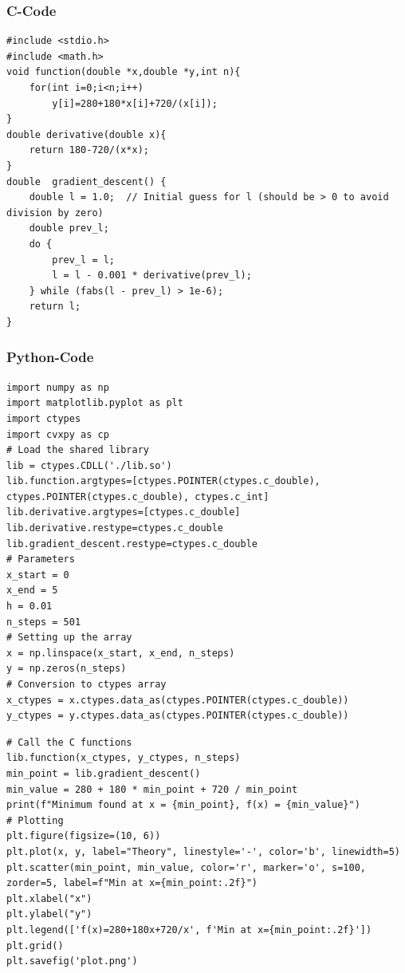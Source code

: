 \documentclass{beamer}
\begin{document}
\begin{frame}[fragile]
\frametitle{C-Code}
\begin{verbatim}
#include <stdio.h>
#include <math.h>
void function(double *x,double *y,int n){
	for(int i=0;i<n;i++)
		y[i]=280+180*x[i]+720/(x[i]);
}
double derivative(double x){
	return 180-720/(x*x);
}
double  gradient_descent() {
    double l = 1.0;  // Initial guess for l (should be > 0 to avoid division by zero)
    double prev_l;
    do {
        prev_l = l;
        l = l - 0.001 * derivative(prev_l);
    } while (fabs(l - prev_l) > 1e-6);
    return l; 
}
\end{verbatim}
\end{frame}
\begin{frame}[fragile]
\frametitle{Python-Code}
\begin{verbatim}
import numpy as np
import matplotlib.pyplot as plt
import ctypes
import cvxpy as cp
# Load the shared library
lib = ctypes.CDLL('./lib.so')
lib.function.argtypes=[ctypes.POINTER(ctypes.c_double), ctypes.POINTER(ctypes.c_double), ctypes.c_int]
lib.derivative.argtypes=[ctypes.c_double]
lib.derivative.restype=ctypes.c_double
lib.gradient_descent.restype=ctypes.c_double
# Parameters
x_start = 0
x_end = 5
h = 0.01
n_steps = 501
# Setting up the array
x = np.linspace(x_start, x_end, n_steps)
y = np.zeros(n_steps)
# Conversion to ctypes array
x_ctypes = x.ctypes.data_as(ctypes.POINTER(ctypes.c_double))
y_ctypes = y.ctypes.data_as(ctypes.POINTER(ctypes.c_double))

\end{verbatim}
\end{frame}
\begin{frame}[fragile]
\begin{verbatim}
# Call the C functions
lib.function(x_ctypes, y_ctypes, n_steps)
min_point = lib.gradient_descent()
min_value = 280 + 180 * min_point + 720 / min_point
print(f"Minimum found at x = {min_point}, f(x) = {min_value}")
# Plotting
plt.figure(figsize=(10, 6))
plt.plot(x, y, label="Theory", linestyle='-', color='b', linewidth=5)
plt.scatter(min_point, min_value, color='r', marker='o', s=100, zorder=5, label=f"Min at x={min_point:.2f}")
plt.xlabel("x")
plt.ylabel("y")
plt.legend(['f(x)=280+180x+720/x', f'Min at x={min_point:.2f}'])
plt.grid()
plt.savefig('plot.png')
\end{verbatim}
\end{frame}
\end{document}

